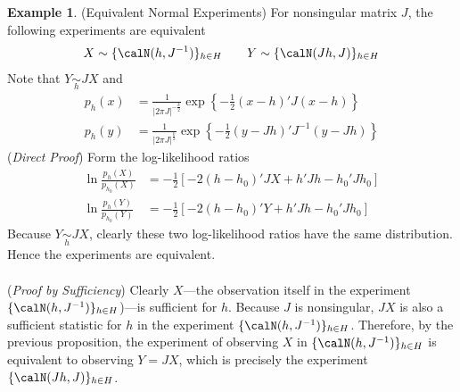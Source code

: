 \documentclass[12pt]{article}
\theoremstyle{plain}
\theoremstyle{definition}
\newtheorem{ex}[thm]{Example}
\theoremstyle{remark}
\begin{document}
\begin{ex}(Equivalent Normal Experiments)
For nonsingular matrix $J$, the following experiments are equivalent
\begin{align*}
  X\sim\{\calN(h,J^{-1})\}_{h\in H}
  \qquad
  Y\sim\{\calN(Jh,J)\}_{h\in H}
\end{align*}
Note that $Y \underset{h}{\sim} JX$ and
\begin{align}
  p_h(x)
  &=
  \frac{1}{|2\pi J|^{-\frac{k}{2}}}
  \exp\left\{
  -
  \frac{1}{2}
  (x-h)'J(x-h)
  \right\}
  \label{expX}
  \\
  p_h(y)
  &=
  \frac{1}{|2\pi J|^{\frac{k}{2}}}
  \exp\left\{
  -
  \frac{1}{2}
  (y-Jh)'J^{-1}(y-Jh)
  \right\}
  \label{expY}
\end{align}
(\emph{Direct Proof})
Form the log-likelihood ratios
\begin{align*}
  \ln\frac{p_h(X)}{p_{h_0}(X)}
  &=
  -
  \frac{1}{2}
  \left[
  - 2 (h-h_0)'JX
  + h'Jh
  - h_0'Jh_0
  \right]
  \\
  \ln
  \frac{p_h(Y)}{p_{h_0}(Y)}
  &=
  -
  \frac{1}{2}
  \left[
  - 2 (h-h_0)'Y
  + h'Jh
  - h_0'Jh_0
  \right]
\end{align*}
Because $Y\underset{h}{\sim} JX$, clearly these two log-likelihood
ratios have the same distribution. Hence the experiments are equivalent.
\\
\\
(\emph{Proof by Sufficiency})
Clearly $X$---the observation itself in the experiment
$\{\calN(h,J^{-1})\}_{h\in H}$)---is sufficient for $h$.
Because $J$ is nonsingular, $JX$ is also a sufficient statistic for $h$
in the experiment $\{\calN(h,J^{-1})\}_{h\in H}$.
Therefore, by the previous proposition, the experiment
of observing $X$ in $\{\calN(h,J^{-1})\}_{h\in H}$ is equivalent to
observing $Y=JX$, which is precisely the experiment
$\{\calN(Jh,J)\}_{h\in H}$.
\end{ex}
\end{document}
